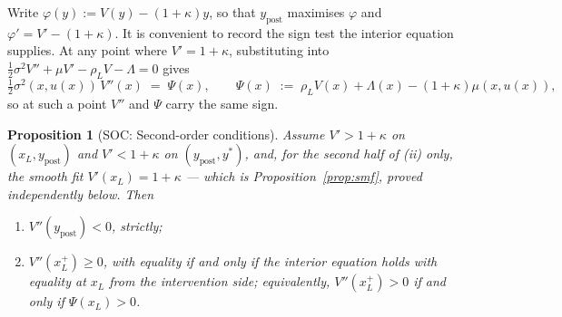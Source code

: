 \documentclass[11pt]{article}
\newtheorem{proposition}{Proposition}
\theoremstyle{remark}
\begin{document}
Write $\varphi(y) := V(y)-(1+\kappa)y$, so that $y_{\mathrm{post}}$
maximises $\varphi$ and $\varphi' = V'-(1+\kappa)$. It is convenient to
record the sign test the interior equation supplies. At any point where
$V'=1+\kappa$, substituting into
$\tfrac12\sigma^2V''+\mu V'-\rho_LV-\Lambda=0$ gives
\begin{equation}
\tfrac12\sigma^2(x,u(x))\,V''(x) \;=\; \Psi(x),
\qquad
\Psi(x) \;:=\; \rho_L V(x) + \Lambda(x) - (1+\kappa)\mu(x,u(x)),
\label{eq:Psi}
\end{equation}
so at such a point $V''$ and $\Psi$ carry the same sign.

\begin{proposition}[SOC: Second-order conditions]
\label{prop:soc}
Assume $V'>1+\kappa$ on $(x_L,y_{\mathrm{post}})$ and $V'<1+\kappa$ on
$(y_{\mathrm{post}},y^*)$, and, for the second half of (ii) only, the
smooth fit $V'(x_L)=1+\kappa$ --- which is
Proposition~\ref{prop:smf}, proved independently below.
Then
\begin{enumerate}
\item[(i)] $V''(y_{\mathrm{post}}) < 0$, strictly;
\item[(ii)] $V''(x_L^{+}) \ge 0$, with equality if and only if the
  interior equation holds with equality at $x_L$ from the intervention
  side; equivalently, $V''(x_L^{+})>0$ if and only if $\Psi(x_L)>0$.
\end{enumerate}
\end{proposition}
\end{document}
